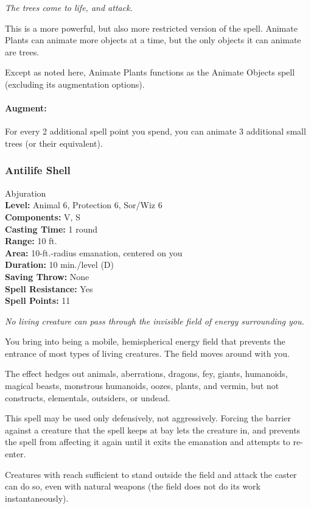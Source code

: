 \emph{The trees come to life, and attack.}

This is a more powerful, but also more restricted version of the  spell. Animate Plants can animate more objects at a time, but the only objects it can animate are trees. 

Except as noted here, Animate Plants functions as the Animate Objects spell (excluding its augmentation options).

\paragraph{Augment:} For every 2 additional spell point you spend, you can animate 3 additional small trees (or their equivalent).
\subsubsection{Antilife Shell}
\label{Spell:AntilifeShell}
Abjuration
\\ \textbf{Level:} Animal 6, Protection 6, Sor/Wiz 6
\\ \textbf{Components:} V, S
\\ \textbf{Casting Time:} 1 round
\\ \textbf{Range:} 10 ft.
\\ \textbf{Area:} 10-ft.-radius emanation, centered on you
\\ \textbf{Duration:} 10 min./level (D)
\\ \textbf{Saving Throw:} None
\\ \textbf{Spell Resistance:} Yes
\\ \textbf{Spell Points:} 11

\emph{No living creature can pass through the invisible field of energy surrounding you.}

You bring into being a mobile, hemispherical energy field that prevents the entrance of most types of living creatures.
The field moves around with you.

The effect hedges out animals, aberrations, dragons, fey, giants, humanoids, magical beasts, monstrous humanoids, oozes, plants, and vermin, but not constructs, elementals, outsiders, or undead.

This spell may be used only defensively, not aggressively. Forcing the barrier against a creature that the spell keeps at bay lets the creature in, and prevents the spell from affecting it again until it exits the emanation and attempts to re-enter.

Creatures with reach sufficient to stand outside the field and attack the caster can do so, even with natural weapons (the field does not do its work instantaneously).

